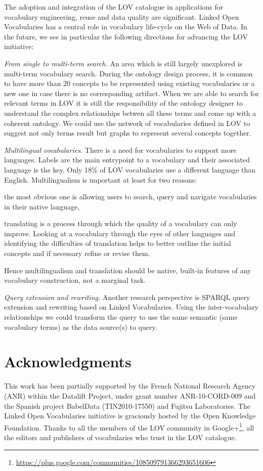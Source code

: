 \documentclass{iosart2c}
\begin{document}
The adoption and integration of the LOV catalogue in applications for vocabulary engineering, reuse and data quality are significant. Linked Open Vocabularies has a central role in vocabulary life-cycle on the Web of Data. In the future, we see in particular the following directions for advancing the LOV initiative:

\emph{From single to multi-term search.} An area which is still largely unexplored is multi-term vocabulary search. During the ontology design process, it is common to have more than 20 concepts to be represented using existing vocabularies or a new one in case there is no corresponding artifact. When we are able to search for relevant terms in LOV it is still the responsibility of the ontology designer to understand the complex relationships betwen all these terms and come up with a coherent ontology. We could use the network of vocabularies defined in LOV to suggest not only terms result but graphs to represent several concepts together.

\emph{Multilingual vocabularies.} There is a need for vocabularies to support more languages. Labels are the main entrypoint to a vocabulary and their associated language is the key. Only 18\% of LOV vocabularies use a different language than English. Multilingualism is important at least for two reasons: 
\begin{inparaenum}[1)] 
	\item the most obvious one is allowing users to search, query and navigate vocabularies in their native language,
	\item translating is a process through which the quality of a vocabulary can only improve. Looking at a vocabulary through the eyes of other languages and identifying the difficulties of translation helps to better outline the initial concepts and if necessary refine or revise them. 
\end{inparaenum} 
Hence multilingualism and translation should be native, built-in features of any vocabulary construction, not a marginal task.

\emph{Query extension and rewriting.} Another research perspective is SPARQL query extension and rewriting based on Linked Vocabularies. Using the inter-vocabulary relationships we could transform the query to use the same semantic (same vocabulary terms) as the data source(s) to query.

\section*{Acknowledgments}
This work has been partially supported by the French National Research Agency (ANR) within the Datalift Project, under grant number ANR-10-CORD-009 and the Spanish project BabelData (TIN2010-17550) and Fujitsu Laboratories. The Linked Open Vocabularies initiative is graciously hosted by the Open Knowledge Foundation. Thanks to all the members of the LOV community in Google+\footnote{\url{https://plus.google.com/communities/108509791366293651606}}, all the editors and publishers of vocabularies who trust in the LOV catalogue. 




\end{document}
